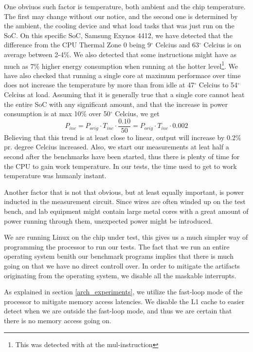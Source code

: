 One obviuos such factor is temperature, both ambient and
the chip temperature. The first may change without our notice, and the second one is
determined by the ambient, the cooling device and what load tasks that was just run on
the SoC. On this specific SoC, Samsung Exynos 4412, we have detected that the difference
from the CPU Thermal Zone 0 being 9$^\circ$ Celcius and 63$^\circ$ Celcius is on average
between 2-4\%. We also detected that some instructions might have as much as 7\% higher
energy consumption when running at the hotter level\footnote{This was detected with at
the {\ttfamily mul}-instruction}. We have also checked that running a single core at
maximum performace over time does not increase the temperature by more than from
idle at 47$^\circ$ Celcius to 54$^\circ$ Celcius at load. Assuming that it is generally
true that a single core cannot heat the entire SoC with any significant amount, and that
the increase in power consumption is at max 10\% over 50$^\circ$ Celcius, we get
\begin{equation}
    P_{inc} = P_{orig} \cdot T_{inc} \cdot \frac{0.10}{50} = P_{orig} \cdot T_{inc} \cdot 0.002
\end{equation}
Believing that this trend is at least close to linear, output will increase by 0.2\% pr.
degree Celcius increased. Also, we start our measurements at leat half a second after the benchmarks
have been started, thus there is plenty of time for the CPU to gain work temperature. In our
tests, the time used to get to work temperature was humanly instant.

Another factor that is not that obvious, but at least equally important, is power inducted
in the measurement circuit. Since wires are often winded up on the test bench, and lab equipment
might contain large metal cores with a great amount of power running through them, unexpected
power might be introduced.

We are running Linux on the chip under test, this gives us a much simpler way of programming
the processor to run our tests. The fact that we run an entire operating system benith our
benchmark programs implies that there is much going on that we have no direct controll over.
In order to mitigate the artifacts originating from the operating system, we
disable all the maskable interrupts.

As explained in section \ref{arch_experiments}, we utilize the fast-loop mode of the processor to mitigate
memory access latencies. We disable the L1 cache to easier detect when we are outside the fast-loop mode,
and thus we are certain that there is no memory access going on.

